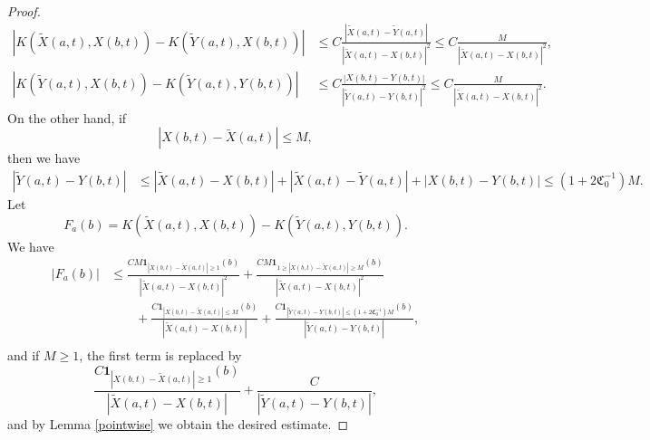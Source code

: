 \documentclass[10pt,a4paper]{amsart}
\begin{document}
\begin{proof}
\begin{equation*}
\begin{split}
\left | K(\tilde X(a,t), X(b,t) ) - K(\tilde Y(a,t), X(b,t) ) \right | &\le  C \frac{|\tilde X(a,t) - \tilde Y(a,t) | }{|\tilde X(a,t) -X(b,t) |^2}  \le C \frac{ M } {|\tilde X(a,t) - X(b,t) |^2} , \\
\left | K(\tilde Y(a,t), X(b,t) ) - K(\tilde Y(a,t), Y(b,t) ) \right | &\le C \frac{|X(b,t) - Y(b,t) | }{ |\tilde Y(a,t) - Y(b,t) | ^2 } \le C \frac{M }{|\tilde{X}(a,t) - X(b,t) |^2}.
\end{split}
\end{equation*}
On the other hand, if
\begin{equation}\label{abclose}
|X(b,t) -\tilde X(a,t) | \le M,  
\end{equation}
then we have
\begin{equation}
\begin{split}\nonumber
|\tilde Y(a, t) - Y(b,t) | &\le |\tilde X(a,t) -  X(b,t) | +|\tilde X (a,t) - \tilde Y(a, t) | + | X(b,t) - Y(b,t) | \le (1+2 \mathfrak{C}_0 ^{-1} ) M.
\end{split}
\end{equation}
Let 
\begin{equation}
F_{a} (b) = K(\tilde{X} (a,t), X(b,t) ) - K(\tilde{Y} (a,t) , Y(b,t) ).
\end{equation}
We have
\begin{equation}
\begin{split}
|F_{a} (b) | &\le   \frac{CM \mathbf{1}_{|X(b,t) - \tilde{X}(a,t) | \ge 1 } (b)}{|\tilde{X} (a,t) - X(b,t) |^2}  + \frac{C M  \mathbf{1}_{1 \ge |X(b,t) - \tilde{X}(a,t) | \ge M } (b) }{|\tilde{X} (a,t) - X(b,t) |^2} \\
&\qquad +  \frac{C \mathbf{1}_{|X(b,t) - \tilde{X}(a,t) | \le M } (b)}{|\tilde{X}(a,t) - X(b,t) | } + \frac{ C \mathbf{1}_{|\tilde{Y}(a,t) - Y(b,t) | \le (1+2 \mathfrak{C}_0^{-1} ) M } (b)}{|\tilde{Y}(a,t) - Y(b,t) | }, \\
\end{split}
\end{equation}
and if $M \ge 1$, the first term is replaced by
\begin{equation}
 \frac{C \mathbf{1}_{|X(b,t) - \tilde{X} (a,t) | \ge 1} (b)}{|\tilde{X}(a,t) - X(b,t) |} + \frac{C}{|\tilde{Y}(a,t) - Y(b,t) |},
\end{equation}
and by Lemma \ref{pointwise} we obtain the desired estimate.
\end{proof}
\end{document}
